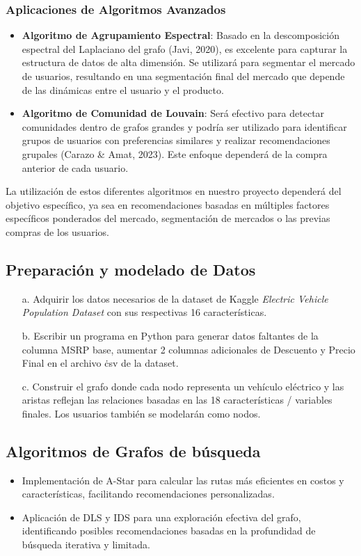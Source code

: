 \documentclass[12pt]{article}
\begin{document}
\subsubsection*{Aplicaciones de Algoritmos Avanzados}
\begin{itemize}
    \item \textbf{Algoritmo de Agrupamiento Espectral}: Basado en la descomposición espectral del Laplaciano del grafo (Javi, 2020), es excelente para capturar la estructura de datos de alta dimensión. Se utilizará para segmentar el mercado de usuarios, resultando en una segmentación final del mercado que depende de las dinámicas entre el usuario y el producto.
    \item \textbf{Algoritmo de Comunidad de Louvain}: Será efectivo para detectar comunidades dentro de grafos grandes y podría ser utilizado para identificar grupos de usuarios con preferencias similares y realizar recomendaciones grupales (Carazo \& Amat, 2023). Este enfoque dependerá de la compra anterior de cada usuario.
\end{itemize}

La utilización de estos diferentes algoritmos en nuestro proyecto dependerá del objetivo específico, ya sea en recomendaciones basadas en múltiples factores específicos ponderados del mercado, segmentación de mercados o las previas compras de los usuarios.



\subsection{Preparación y modelado de Datos}
\begin{enumerate}
    \item[a.] Adquirir los datos necesarios de la dataset de Kaggle \textit{Electric Vehicle Population Dataset} con sus respectivas 16 características. 
    \item[b.] Escribir un programa en Python para generar datos faltantes de la columna MSRP base, aumentar 2 columnas adicionales de Descuento y Precio Final en el archivo \.csv de la dataset.
    \item[c.] Construir el grafo donde cada nodo representa un vehículo eléctrico y las aristas reflejan las relaciones basadas en las 18 características / variables finales. Los usuarios también se modelarán como nodos.
\end{enumerate}


\subsection{Algoritmos de Grafos de búsqueda}
\begin{itemize}
    \item Implementación de A-Star para calcular las rutas más eficientes en costos y características, facilitando recomendaciones personalizadas.
    \item Aplicación de DLS y IDS para una exploración efectiva del grafo, identificando posibles recomendaciones basadas en la profundidad de búsqueda iterativa y limitada.
\end{itemize}
\end{document}
